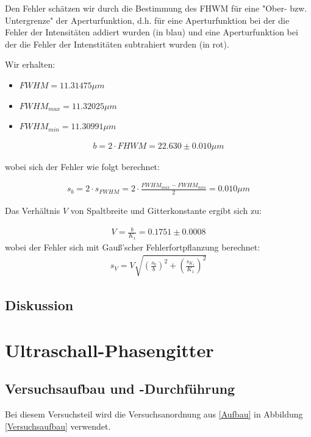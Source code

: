 \documentclass[12pt]{article}
\begin{document}
Den Fehler schätzen wir durch die Bestimmung des FHWM für eine "Ober- bzw. Untergrenze" der Aperturfunktion, d.h. für eine Aperturfunktion bei der die Fehler der Intensitäten addiert wurden (in blau) und eine Aperturfunktion bei der die Fehler der Intenstitäten subtrahiert wurden (in rot).

Wir erhalten:

\begin{itemize}
\item $FWHM = 11.31475 \mu m $
\item$ FWHM_{max} = 11.32025 \mu m  $
\item $ FWHM_{min} = 11.30991 \mu m  $
\end{itemize}

\begin{align*}
b = 2 \cdot FHWM = 22.630  \pm  0.010 \mu m
\end{align*}

wobei sich der Fehler wie folgt berechnet:

\begin{align*}
s_b = 2 \cdot s_{FWHM} = 2 \cdot \frac{FWHM_{max}-FWHM_{min}}{2} = 0.010 \mu m
\end{align*}

Das Verhältnis $V$ von Spaltbreite und Gitterkonstante ergibt sich zu:

\begin{align*}
V=\frac{b}{K_1} = 0.1751\pm 0.0008
\end{align*}
wobei der Fehler sich mit Gauß'scher Fehlerfortpflanzung berechnet: 
\begin{align*}
 s_V=V\sqrt{\left( \frac{s_b}{b}\right)^2 +\left( \frac{s_{K_1}}{K_1}\right)^2 }
\end{align*}


\newpage
\subsection{Diskussion\label{BOOOOOMMMM!!!!!!!!!}} 


\newpage
\section{Ultraschall-Phasengitter}


\subsection{Versuchsaufbau und -Durchführung}

Bei diesem Versuchsteil wird die Versuchsanordnung aus \ref{Aufbau} in Abbildung \ref{Versuchsaufbau} verwendet.
\end{document}
